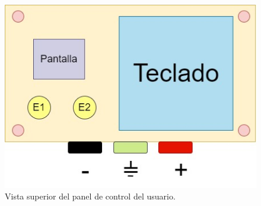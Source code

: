 \begin{figure}[H]
    \centering
    \includegraphics[scale=0.4]{./imagenes/caja_usuario.jpg}
    \caption{Vista superior del panel de control del usuario.}
    \label{F:caja_usuario}
\end{figure}

